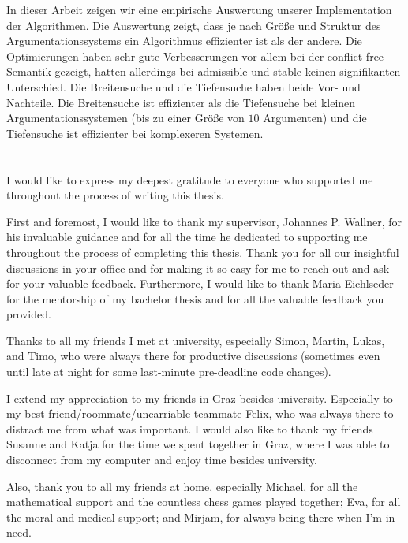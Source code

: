\documentclass[twoside,openright]{scrreprt}
\begin{document}
In dieser Arbeit zeigen wir eine empirische Auswertung unserer Implementation der Algorithmen. Die Auswertung zeigt, dass je nach Größe und Struktur des Argumentationssystems ein Algorithmus effizienter ist als der andere. Die Optimierungen haben sehr gute Verbesserungen vor allem bei der conflict-free Semantik gezeigt, hatten allerdings bei admissible und stable keinen signifikanten Unterschied. Die Breitensuche und die Tiefensuche haben beide Vor- und Nachteile. Die Breitensuche ist effizienter als die Tiefensuche bei kleinen Argumentationssystemen (bis zu einer Größe von $10$ Argumenten) und die Tiefensuche ist effizienter bei komplexeren Systemen.



\cleardoublepage

\chapter*{}

I would like to express my deepest gratitude to everyone who supported me throughout the process of writing this thesis.

First and foremost, I would like to thank my supervisor, Johannes P. Wallner, for his invaluable guidance and for all the time he dedicated to supporting me throughout the process of completing this thesis. Thank you for all our insightful discussions in your office and for making it so easy for me to reach out and ask for your valuable feedback. Furthermore, I would like to thank Maria Eichlseder for the mentorship of my bachelor thesis and for all the valuable feedback you provided.

Thanks to all my friends I met at university, especially Simon, Martin, Lukas, and Timo, who were always there for productive discussions (sometimes even until late at night for some last-minute pre-deadline code changes).

I extend my appreciation to my friends in Graz besides university. Especially to my best-friend/roommate/uncarriable-teammate Felix, who was always there to distract me from what was important. I would also like to thank my friends Susanne and Katja for the time we spent together in Graz, where I was able to disconnect from my computer and enjoy time besides university.

Also, thank you to all my friends at home, especially Michael, for all the mathematical support and the countless chess games played together; Eva, for all the moral and medical support; and Mirjam, for always being there when I'm in need.
\end{document}

